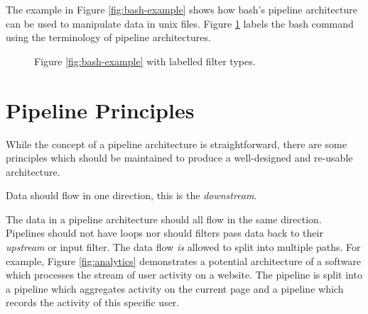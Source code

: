 The example in Figure \ref{fig:bash-example} shows how bash's pipeline architecture can be used to manipulate data in unix files.
Figure \ref{fig:bash-example-labelled} labels the bash command using the terminology of pipeline architectures.

\begin{figure}[H]
    \centering
{}
\caption{Figure \ref{fig:bash-example} with labelled filter types.}
\label{fig:bash-example-labelled}
\end{figure}

\section{Pipeline Principles}
While the concept of a pipeline architecture is straightforward,
there are some principles which should be maintained to produce a well-designed and re-usable architecture.

\begin{definition}
    Data should flow in one direction, this is the \textsl{downstream}.
\end{definition}

The data in a pipeline architecture should all flow in the same direction.
Pipelines should not have loops nor should filters pass data back to their \textsl{upstream} or input filter.
The data flow \textsl{is} allowed to split into multiple paths.
For example, Figure \ref{fig:analytics} demonstrates a potential architecture of a software which processes the stream of user activity on a website.
The pipeline is split into a pipeline which aggregates activity on the current page and a pipeline which records the activity of this specific user.

